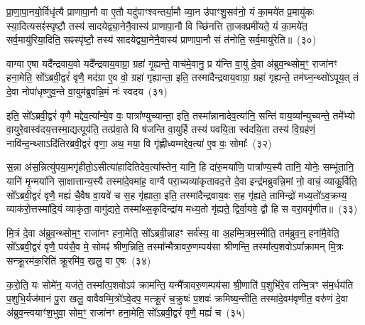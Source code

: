प्रा॒णा॒पा॒नयो॒र्विधृ॑त्यै प्राणापा॒नौ वा ए॒तौ यदु॑पाꣳश्वन्तर्या॒मौ व्या॒न उ॑पाꣳशु॒सव॑नो॒ यं का॒मये॑त प्र॒मायु॑कः स्या॒दित्यसꣴ॑स्पृष्टौ॒ तस्य॑ सादयेद्व्या॒नेनै॒वास्य॑ प्राणापा॒नौ वि च्छि॑नत्ति ता॒जक्प्रमी॑यते॒ यं का॒मये॑त॒ सर्व॒मायु॑रिया॒दिति॒ सꣴस्पृ॑ष्टौ॒ तस्य॑ सादयेद्व्या॒नेनै॒वास्य॑ प्राणापा॒नौ सं त॑नोति॒ सर्व॒मायु॑रेति॥~(३०)

{\anuvakamend[{त॒ उ॒भया᳚न्गृह्यते॒ चतु॑श्चत्वारिꣳशच्च}]}%

वाग्वा ए॒षा यदै᳚न्द्रवाय॒वो यदै᳚न्द्रवाय॒वाग्रा॒ ग्रहा॑ गृ॒ह्यन्ते॒ वाच॑मे॒वानु॒ प्र य॑न्ति वा॒युं दे॒वा अ॑ब्रुव॒न्थ्सोम॒ꣳ॒ राजा॑नꣳ हना॒मेति॒ सो᳚\-ऽब्रवी॒द्वरं॑ वृणै॒ मद॑ग्रा ए॒व वो॒ ग्रहा॑ गृह्यान्ता॒ इति॒ तस्मा॑दैन्द्रवाय॒वाग्रा॒ ग्रहा॑ गृह्यन्ते॒ तम॑घ्न॒न्थ्सो॑\-ऽपूय॒त् तं दे॒वा नोपा॑धृष्णुव॒न्ते वा॒युम॑ब्रुवन्नि॒मं नः॑ स्वदय~(३१)

इति॒ सो᳚\-ऽब्रवी॒द्वरं॑ वृणै मद्देव॒त्या᳚न्ये॒व वः॒ पात्रा᳚ण्युच्यान्ता॒ इति॒ तस्मा᳚न्नानादेव॒त्या॑नि॒ सन्ति॑ वाय॒व्या᳚न्युच्यन्ते॒ तमे᳚भ्यो वा॒युरे॒वास्व॑दय॒त्तस्मा॒द्यत्पूय॑ति॒ तत्प्र॑वा॒ते वि ष॑जन्ति वा॒युर्\mbox{}हि तस्य॑ पवयि॒ता स्व॑दयि॒ता तस्य॑ वि॒ग्रह॑णं॒ नावि॑न्द॒न्थ्सा\-ऽदि॑तिरब्रवी॒द्वरं॑ वृणा॒ अथ॒ मया॒ वि गृ॑ह्णीध्वम्मद्देव॒त्या॑ ए॒व वः॒ सोमाः᳚~(३२)

स॒न्ना अ॑स॒न्नित्यु॑पया॒मगृ॑हीतो॒\-ऽसीत्या॑हादितिदेव॒त्या᳚स्तेन॒ यानि॒ हि दा॑रु॒मया॑णि॒ पात्रा᳚ण्य॒स्यै तानि॒ योनेः॒ सम्भू॑तानि॒ यानि॑ मृ॒न्मया॑नि सा॒क्षात्तान्य॒स्यै तस्मा॑दे॒वमा॑ह॒ वाग्वै परा॒च्यव्या॑कृतावद॒त्ते दे॒वा इन्द्र॑मब्रुवन्नि॒मां नो॒ वाचं॒ व्याकु॒र्विति॒ सो᳚\-ऽब्रवी॒द्वरं॑ वृणै॒ मह्यं॑ चै॒वैष वा॒यवे॑ च स॒ह गृ॑ह्याता॒ इति॒ तस्मा॑दैन्द्रवाय॒वः स॒ह गृ॑ह्यते॒ तामिन्द्रो॑ मध्य॒तो॑\-ऽव॒क्रम्य॒ व्याक॑रो॒त्तस्मा॑दि॒यं व्याकृ॑ता॒ वागु॑द्यते॒ तस्मा᳚थ्स॒कृदिन्द्रा॑य मध्य॒तो गृ॑ह्यते॒ द्विर्वा॒यवे॒ द्वौ हि स वरा॒ववृ॑णीत॥~(३३)

{\anuvakamend[{स्व॒द॒य॒ सोमाः᳚ स॒हाष्टाविꣳ॑शतिश्च}]}%

मि॒त्रं दे॒वा अ॑ब्रुव॒न्थ्सोम॒ꣳ॒ राजा॑नꣳ हना॒मेति॒ सो᳚\-ऽब्रवी॒न्नाहꣳ सर्व॑स्य॒ वा अ॒हम्मि॒त्रम॒स्मीति॒ तम॑ब्रुव॒न्॒ हना॑मै॒वेति॒ सो᳚\-ऽब्रवी॒द्वरं॑ वृणै॒ पय॑सै॒व मे॒ सोमꣴ॑ श्रीण॒न्निति॒ तस्मा᳚न्मैत्रावरु॒णम्पय॑सा श्रीणन्ति॒ तस्मा᳚त्प॒शवो\-ऽपा᳚क्रामन् मि॒त्रः सन्क्रू॒रम॑क॒रिति॑ क्रू॒रमि॑व॒ खलु॒ वा ए॒षः~(३४)

क॒रो॒ति॒ यः सोमे॑न॒ यज॑ते॒ तस्मा᳚त्प॒शवो\-ऽप॑ क्रामन्ति॒ यन्मै᳚त्रावरु॒णम्पय॑सा श्री॒णाति॑ प॒शुभि॑रे॒व तन्मि॒त्रꣳ स॑म॒र्धय॑ति प॒शुभि॒र्यज॑मानं पु॒रा खलु॒ वावैवम्मि॒त्रो॑\-ऽवे॒दप॒ मत्क्रू॒रं च॒क्रुषः॑ प॒शवः॑ क्रमिष्य॒न्तीति॒ तस्मा॑दे॒वम॑वृणीत॒ वरु॑णं दे॒वा अ॑ब्रुव॒न्त्वयाꣳ॑श॒भुवा॒ सोम॒ꣳ॒ राजा॑नꣳ हना॒मेति॒ सो᳚\-ऽब्रवी॒द्वरं॑ वृणै॒ मह्यं॑ च~(३५)

